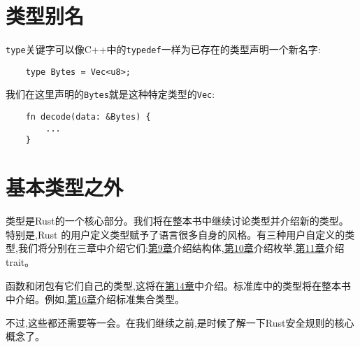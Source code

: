 \section{类型别名}

\texttt{type}关键字可以像C++中的\texttt{typedef}一样为已存在的类型声明一个新名字:
\begin{verbatim}
    type Bytes = Vec<u8>;
\end{verbatim}

我们在这里声明的\texttt{Bytes}就是这种特定类型的\texttt{Vec}:
\begin{verbatim}
    fn decode(data: &Bytes) {
        ...
    }
\end{verbatim}

\section{基本类型之外}

类型是Rust的一个核心部分。我们将在整本书中继续讨论类型并介绍新的类型。特别是,Rust 的用户定义类型赋予了语言很多自身的风格。有三种用户自定义的类型,我们将分别在三章中介绍它们:\hyperref[ch09]{第9章}介绍结构体,\hyperref[ch10]{第10章}介绍枚举,\hyperref[ch11]{第11章}介绍trait。

函数和闭包有它们自己的类型,这将在\hyperref[ch14]{第14章}中介绍。标准库中的类型将在整本书中介绍。例如,\hyperref[ch16]{第16章}介绍标准集合类型。

不过,这些都还需要等一会。在我们继续之前,是时候了解一下Rust安全规则的核心概念了。
